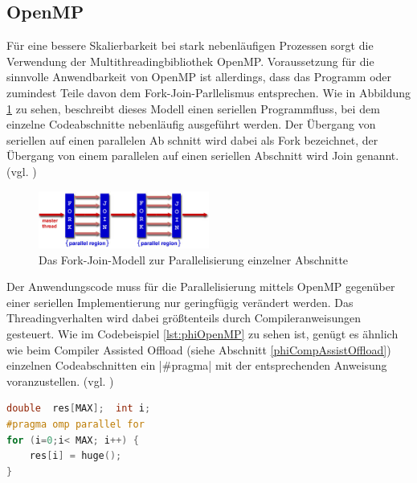 \documentclass[../main.tex]{subfiles}
\begin{document}
\subsection{OpenMP}
Für eine bessere Skalierbarkeit bei stark nebenläufigen Prozessen sorgt die Verwendung der Multithreadingbibliothek OpenMP. Voraussetzung für die sinnvolle Anwendbarkeit von OpenMP ist allerdings, dass das Programm oder zumindest Teile davon dem Fork-Join-Parllelismus entsprechen. Wie in Abbildung \ref{pic:phiForkJoin} zu sehen, beschreibt dieses Modell einen seriellen Programmfluss, bei dem einzelne Codeabschnitte nebenläufig ausgeführt werden. Der Übergang von seriellen auf einen parallelen Ab schnitt wird dabei als Fork bezeichnet, der Übergang von einem parallelen auf einen seriellen Abschnitt wird Join genannt. (vgl. \cite{phiOpenmpDoku})
\begin{figure}
	\centering 
	\includegraphics[width=0.5\textwidth]{../images/Schmidt/fork_join.jpg} 
	\caption {Das Fork-Join-Modell zur Parallelisierung einzelner Abschnitte}
	\label{pic:phiForkJoin} 
\end{figure} 
Der Anwendungscode muss für die Parallelisierung mittels OpenMP gegenüber einer seriellen Implementierung nur geringfügig verändert werden. Das Threadingverhalten wird dabei größtenteils durch Compileranweisungen gesteuert. Wie im Codebeispiel \ref{lst:phiOpenMP} zu sehen ist, genügt es ähnlich wie beim Compiler Assisted Offload (siehe Abschnitt \ref{phiCompAssistOffload}) einzelnen Codeabschnitten ein |#pragma| mit der entsprechenden Anweisung voranzustellen. (vgl. \cite{phiOpenmpDoku})
\begin{lstlisting}[language=c, caption={Beispielfunktion mit pragma zur Nebenläufigen Ausführung einer for-Schleife(Quelle: \parencite{phiOpenmpDoku})}, captionpos=b, label=lst:phiOpenMP, frame=single, linewidth=\textwidth, breaklines=true]
double  res[MAX];  int i;
#pragma omp parallel for
for (i=0;i< MAX; i++) {
	res[i] = huge();
}
\end{lstlisting}
\end{document}
